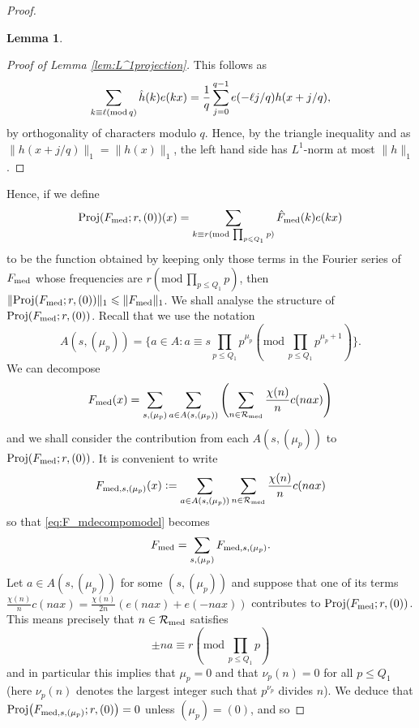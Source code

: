 \documentclass[11pt, reqno]{amsart}
\newtheorem{lemma}[theorem]{Lemma}
\newcommand{\md}[1]{\ensuremath{(\mbox{mod}\, #1)}}
\newcommand{\mdsub}[1]{\ensuremath{(\mbox{\scriptsize mod}\, #1)}}
\DeclareMathOperator{\Proj}{Proj}
\begin{document}
\begin{proof}
\begin{lemma}
    \end{lemma}
    \begin{proof}[Proof of Lemma \ref{lem:L^1projection}]
        This follows as
        \begin{align*}
            \sum_{k\equiv \ell\mdsub q}\hat{h}(k)e(kx)=\frac{1}{q}\sum_{j=0}^{q-1}e(-\ell j/q)h(x+j/q),
        \end{align*}
        by orthogonality of characters modulo $q$. Hence, by the triangle inequality and as $\lVert h(x+j/q)\rVert_1=\lVert h(x)\rVert_1$, the left hand side has $L^1$-norm at most $\lVert h\rVert_1$.
    \end{proof}
    Hence, if we define $$\Proj(F_\textnormal{med};r,(0))(x)=\sum_{k\equiv r\mdsub{\prod_{p\leqslant Q_1} p}}\hat{F}_\textnormal{med}(k)e(kx)$$
    to be the function obtained by keeping only those terms in the Fourier series of $F_\textnormal{med}$ whose frequencies are $r\md {\prod_{p\leqslant Q_1} p}$, then $\lVert \Proj(F_\textnormal{med};r,(0))\rVert_1\leqslant\lVert F_\textnormal{med}\rVert_1$.
    We shall analyse the structure of $\Proj(F_\textnormal{med};r,(0))$. Recall that we use the notation $$A(s,(\mu_p))=\{a\in A: a\equiv s\prod_{p\leqslant Q_1} p^{\mu_p}\md{\prod_{p\leqslant Q_1} p^{\mu_p+1}}\}.$$ We can decompose
    \begin{equation}\label{eq:F_mdecompomodel}F_\textnormal{med}(x)=\sum_{s,(\mu_p)}\sum_{a\in A(s,(\mu_p))}\left(\sum_{n\in\mathcal{R}_\textnormal{med}}\frac{\chi(n)}{n}c (nax)\right)
    \end{equation}
    and we shall consider the contribution from each $A(s,(\mu_p))$ to $\Proj(F_\textnormal{med};r,(0))$. It is convenient to write
    $$F_{\textnormal{med},s,(\mu_p)}(x)\vcentcolon=\sum_{a\in A(s,(\mu_p))}\sum_{n\in \mathcal{R}_\textnormal{med}}\frac{\chi(n)}{n}c( nax)$$
    so that \eqref{eq:F_mdecompomodel} becomes
    \begin{equation*}\label{eq:F_mdecompomodel2}
        F_\textnormal{med}=\sum_{s,(\mu_p)}F_{\textnormal{med},s,(\mu_p)}.
    \end{equation*}
    Let $a\in A(s,(\mu_p))$ for some $(s,(\mu_p))$ and suppose that one of its terms $\frac{\chi(n)}{n}c( nax)=\frac{\chi(n)}{2n}(e(nax)+e(-nax))$ contributes to $\Proj(F_\textnormal{med};r,(0))$. This means precisely that $n\in\mathcal{R}_\textnormal{med}$ satisfies $$\pm na\equiv r\md{\prod_{p\leqslant Q_1} p}$$ and in particular this implies that $\mu_p=0$ and that $\nu_p(n)=0$ for all $p\leqslant Q_1$ (here $\nu_p(n)$ denotes the largest integer such that $p^{\nu_p}$ divides $n$). We deduce that $\Proj\bigl(F_{\textnormal{med},s,(\mu_p)};r,(0)\bigr)=0$ unless $(\mu_p)= (0)$, and so

\end{proof}
\end{document}
